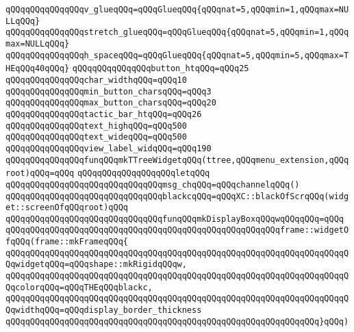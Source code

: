 \verb|qQQqqQQqqQQqqQQqv_glueqQQq=qQQqGlueqQQq{qQQqnat=5,qQQqmin=1,qQQqmax=NULLqQQq}|\newline
\verb|qQQqqQQqqQQqqQQqstretch_glueqQQq=qQQqGlueqQQq{qQQqnat=5,qQQqmin=1,qQQqmax=NULLqQQq}|\newline
\verb|qQQqqQQqqQQqqQQqh_spaceqQQq=qQQqGlueqQQq{qQQqnat=5,qQQqmin=5,qQQqmax=THEqQQq40qQQq}|\newline
\newline
\verb|qQQqqQQqqQQqqQQqbutton_htqQQq=qQQq25|\newline
\verb|qQQqqQQqqQQqqQQqchar_widthqQQq=qQQq10|\newline
\verb|qQQqqQQqqQQqqQQqmin_button_charsqQQq=qQQq3|\newline
\verb|qQQqqQQqqQQqqQQqmax_button_charsqQQq=qQQq20|\newline
\verb|qQQqqQQqqQQqqQQqtactic_bar_htqQQq=qQQq26|\newline
\verb|qQQqqQQqqQQqqQQqtext_highqQQq=qQQq500|\newline
\verb|qQQqqQQqqQQqqQQqtext_wideqQQq=qQQq500|\newline
\verb|qQQqqQQqqQQqqQQqview_label_widqQQq=qQQq190|\newline
\newline
\verb|qQQqqQQqqQQqqQQqfunqQQqmkTTreeWidgetqQQq(ttree,qQQqmenu_extension,qQQqroot)qQQq=qQQq|\newline
\verb|qQQqqQQqqQQqqQQqqQQqletqQQq|\newline
\verb|qQQqqQQqqQQqqQQqqQQqqQQqqQQqqQQqmsg_chqQQq=qQQqchannelqQQq()|\newline
\verb|qQQqqQQqqQQqqQQqqQQqqQQqqQQqqQQqblackcqQQq=qQQqXC::blackOfScrqQQq(widget::screenOfqQQqroot)qQQq|\newline
\newline
\verb|qQQqqQQqqQQqqQQqqQQqqQQqqQQqqQQqfunqQQqmkDisplayBoxqQQqwqQQqqQQq=qQQq|\newline
\verb|qQQqqQQqqQQqqQQqqQQqqQQqqQQqqQQqqQQqqQQqqQQqqQQqqQQqqQQqframe::widgetOfqQQq(frame::mkFrameqQQq{|\newline
\verb|qQQqqQQqqQQqqQQqqQQqqQQqqQQqqQQqqQQqqQQqqQQqqQQqqQQqqQQqqQQqqQQqqQQqqQQqwidgetqQQq=qQQqshape::mkRigidqQQqw,|\newline
\verb|qQQqqQQqqQQqqQQqqQQqqQQqqQQqqQQqqQQqqQQqqQQqqQQqqQQqqQQqqQQqqQQqqQQqqQQqcolorqQQq=qQQqTHEqQQqblackc,|\newline
\verb|qQQqqQQqqQQqqQQqqQQqqQQqqQQqqQQqqQQqqQQqqQQqqQQqqQQqqQQqqQQqqQQqqQQqqQQqwidthqQQq=qQQqdisplay_border_thickness|\newline
\verb|qQQqqQQqqQQqqQQqqQQqqQQqqQQqqQQqqQQqqQQqqQQqqQQqqQQqqQQqqQQqqQQq}qQQq)|\newline
